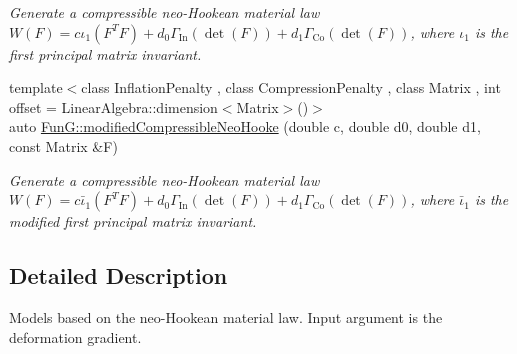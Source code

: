\begin{DoxyCompactItemize}
\begin{DoxyCompactList}\small\item\em Generate a compressible neo-\/\-Hookean material law $ W(F)=c\iota_1(F^T F)+d_0\Gamma_\mathrm{In}(\det(F))+d_1\Gamma_\mathrm{Co}(\det(F)) $, where $\iota_1$ is the first principal matrix invariant. \end{DoxyCompactList}\item 
\hypertarget{group__Rubber_gac10942df03f037afdf0a81d330361a6b}{{\footnotesize template$<$class Inflation\-Penalty , class Compression\-Penalty , class Matrix , int offset = Linear\-Algebra\-::dimension$<$\-Matrix$>$()$>$ }\\auto \hyperlink{group__Rubber_gac10942df03f037afdf0a81d330361a6b}{Fun\-G\-::modified\-Compressible\-Neo\-Hooke} (double c, double d0, double d1, const Matrix \&F)}\label{group__Rubber_gac10942df03f037afdf0a81d330361a6b}

\begin{DoxyCompactList}\small\item\em Generate a compressible neo-\/\-Hookean material law $ W(F)=c\bar\iota_1(F^T F)+d_0\Gamma_\mathrm{In}(\det(F))+d_1\Gamma_\mathrm{Co}(\det(F)) $, where $\bar\iota_1$ is the modified first principal matrix invariant. \end{DoxyCompactList}\end{DoxyCompactItemize}


\subsection{Detailed Description}
Models based on the neo-\/\-Hookean material law. Input argument is the deformation gradient. 